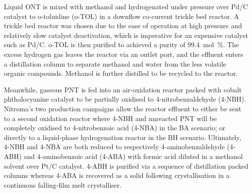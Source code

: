 Liquid ONT is mixed with methanol and hydrogenated under pressure over Pd/C catalyst to o-toluidine (o-TOL) in a downflow co-current trickle bed reactor. A trickle bed reactor was chosen due to the ease of operation at high pressure and relatively slow catalyst deactivation, which is imperative for an expensive catalyst such as Pd/C. o-TOL is then purified to achieved a purity of \SI{99.4}{mol\percent}. The excess hydrogen gas leaves the reactor via an outlet port, and the effluent enters a distillation column to separate methanol and water from the less volatile organic compounds. Methanol is further distilled to be recycled to the reactor. 

Meanwhile, gaseous PNT is fed into an air-oxidation reactor packed with cobalt phthalocyanine catalyst to be partially oxidised to 4-nitrobenzaldehyde (4-NBH). Nitroma's two production campaigns allow the reactor effluent to either be sent to a second oxidation reactor where 4-NBH and unreacted PNT will be completely oxidised to 4-nitrobenzoic acid (4-NBA) in the BA scenario; or directly to a liquid-phase hydrogenation reactor in the BH scenario. Ultimately, 4-NBH and 4-NBA are both reduced to respectively 4-aminobenzaldehyde (4-ABH) and 4-aminobenzoic acid (4-ABA) with formic acid diluted in a methanol solvent over Pt/C catalyst. 4-ABH is purified via a sequence of distillation packed columns whereas 4-ABA is recovered as a solid following  crystallisation in a continuous falling-film melt crystalliser.







 

